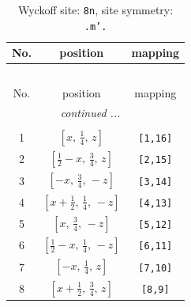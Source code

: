 \documentclass[fleqn,8pt]{jsarticle}
\begin{document}
\begin{longtable}{ccc}
\caption{Wyckoff site: {\tt 8n}, site symmetry: {\tt .m'.}}
 \\
 \hline \hline
No. & position & mapping \\ \hline \endfirsthead

\multicolumn{2}{l}{\tablename\ \thetable{}} \\
 \hline \hline
No. & position & mapping \\ \hline \endhead

 \hline \hline
\multicolumn{2}{r}{\footnotesize\it continued ...} \\ \endfoot

 \hline \hline
\multicolumn{2}{r}{} \\ \endlastfoot

1 & $\left[ x,\, \frac{1}{4},\, z \right]$ & {\tt [1,16]} \\ \hline
2 & $\left[ \frac{1}{2} - x,\, \frac{3}{4},\, z \right]$ & {\tt [2,15]} \\ \hline
3 & $\left[ - x,\, \frac{3}{4},\, - z \right]$ & {\tt [3,14]} \\ \hline
4 & $\left[ x + \frac{1}{2},\, \frac{1}{4},\, - z \right]$ & {\tt [4,13]} \\ \hline
5 & $\left[ x,\, \frac{3}{4},\, - z \right]$ & {\tt [5,12]} \\ \hline
6 & $\left[ \frac{1}{2} - x,\, \frac{1}{4},\, - z \right]$ & {\tt [6,11]} \\ \hline
7 & $\left[ - x,\, \frac{1}{4},\, z \right]$ & {\tt [7,10]} \\ \hline
8 & $\left[ x + \frac{1}{2},\, \frac{3}{4},\, z \right]$ & {\tt [8,9]} \\
\end{longtable}
\renewcommand{\arraystretch}{1.2}
\end{document}
